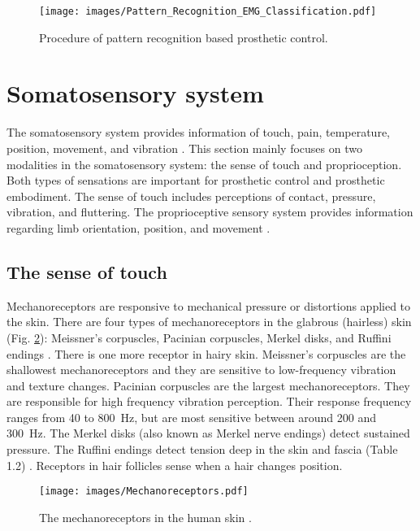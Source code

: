  \begin{figure}[ht!]
    \centering
        \texttt{[image: images/Pattern\_Recognition\_EMG\_Classification.pdf]}
        \caption{Procedure of pattern recognition based prosthetic control.}
        \label{fig:pattern_recognition_emg_classification}
\end{figure}



\section{Somatosensory system}
The somatosensory system provides information of touch, pain, temperature, position, movement, and vibration \cite{hendry_chapter_2013}.
This section mainly focuses on two modalities in the somatosensory system: the sense of touch and proprioception. Both types of sensations are important for prosthetic control and prosthetic embodiment.
The sense of touch includes perceptions of contact, pressure, vibration, and fluttering.
The proprioceptive sensory system provides information regarding limb orientation, position, and movement \cite{grey2010proprioceptive}. 

\subsection{The sense of touch}
Mechanoreceptors are responsive to mechanical pressure or distortions applied to the skin.  There are four types of mechanoreceptors in the glabrous (hairless) skin (Fig. \ref{fig:mechanoreceptor}): Meissner’s corpuscles, Pacinian corpuscles,  Merkel disks, and Ruffini endings \cite{burgesscutaneous1973}. There is one more receptor in hairy skin.  
Meissner’s corpuscles are the shallowest mechanoreceptors and they are sensitive to low-frequency vibration and texture changes.  
Pacinian corpuscles are the largest mechanoreceptors. They are responsible for high frequency vibration perception. Their response frequency ranges from 40 to \SI{800}{Hz}, but are most sensitive between around 200 and \SI{300}{Hz}. The Merkel disks (also known as Merkel nerve endings) detect sustained pressure. The Ruffini endings detect tension deep in the skin and fascia (Table 1.2) \cite{reed_tactile_2002}.
Receptors in hair follicles sense when a hair changes position.

 \begin{figure}[htb!]
    \centering
        \texttt{[image: images/Mechanoreceptors.pdf]}
        \caption{The mechanoreceptors in the human skin \cite{johnson2001roles}.}
        \label{fig:mechanoreceptor}
\end{figure}




